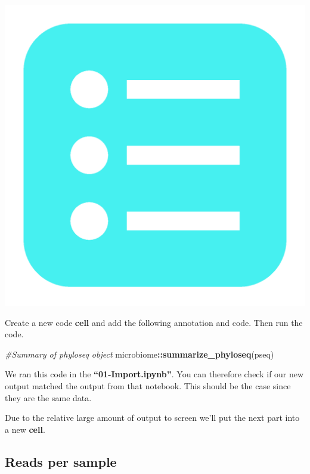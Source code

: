 \documentclass[
]{book}
\newenvironment{Shaded}{\begin{snugshade}}{\end{snugshade}}
\newcommand{\CommentTok}[1]{\textcolor[rgb]{0.56,0.35,0.01}{\textit{#1}}}
\newcommand{\FunctionTok}[1]{\textcolor[rgb]{0.13,0.29,0.53}{\textbf{#1}}}
\newcommand{\NormalTok}[1]{#1}
\newcommand{\SpecialCharTok}[1]{\textcolor[rgb]{0.81,0.36,0.00}{\textbf{#1}}}
\begin{document}
\includegraphics{figures/list_blue.png}

Create a new code \textbf{cell} and add the following annotation and code. Then run the code.

\begin{Shaded}
\begin{Highlighting}[]
\CommentTok{\#Summary of phyloseq object}
\NormalTok{microbiome}\SpecialCharTok{::}\FunctionTok{summarize\_phyloseq}\NormalTok{(pseq)}
\end{Highlighting}
\end{Shaded}

We ran this code in the \textbf{``01-Import.ipynb''}. You can therefore check if our new output matched the output from that notebook. This should be the case since they are the same data.

Due to the relative large amount of output to screen we'll put the next part into a new \textbf{cell}.

\hypertarget{reads-per-sample}{%
\subsection{Reads per sample}\label{reads-per-sample}}
\end{document}
